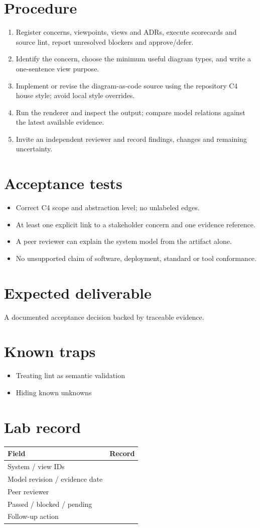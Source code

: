 \documentclass[10pt,letterpaper]{article}
\begin{document}
\section{Procedure}
\begin{enumerate}
\item Register concerns, viewpoints, views and ADRs, execute scorecards and source lint, report unresolved blockers and approve/defer.
\item Identify the concern, choose the minimum useful diagram types, and write a one-sentence view purpose.
\item Implement or revise the diagram-as-code source using the repository C4 house style; avoid local style overrides.
\item Run the renderer and inspect the output; compare model relations against the latest available evidence.
\item Invite an independent reviewer and record findings, changes and remaining uncertainty.
\end{enumerate}

\section{Acceptance tests}
\begin{itemize}
\item Correct C4 scope and abstraction level; no unlabeled edges.
\item At least one explicit link to a stakeholder concern and one evidence reference.
\item A peer reviewer can explain the system model from the artifact alone.
\item No unsupported claim of software, deployment, standard or tool conformance.
\end{itemize}

\section{Expected deliverable}
A documented acceptance decision backed by traceable evidence.


\section{Known traps}
\begin{itemize}
\item Treating lint as semantic validation
\item Hiding known unknowns
\end{itemize}

\section{Lab record}
\begin{tabularx}{\linewidth}{@{}YY@{}}\toprule
\textbf{Field} & \textbf{Record} \\ \midrule
System / view IDs &  \\
Model revision / evidence date &  \\
Peer reviewer &  \\
Passed / blocked / pending &  \\
Follow-up action &  \\
\bottomrule\end{tabularx}
\end{document}
